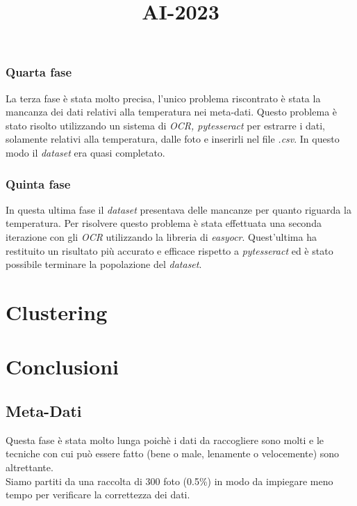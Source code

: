 \title{AI-2023}\documentclass[12pt,a4paper,twoside]{article}
\begin{document}
\subsubsection{Quarta fase}
La terza fase è stata molto precisa, l'unico problema riscontrato è stata la mancanza dei dati relativi alla temperatura nei meta-dati. Questo problema è stato risolto utilizzando un sistema di \textit{OCR, pytesseract} per estrarre i dati, solamente relativi alla temperatura, dalle foto e inserirli nel file \textit{.csv}. In questo modo il \textit{dataset} era quasi completato.
\subsubsection{Quinta fase}
In questa ultima fase il \textit{dataset} presentava delle mancanze per quanto riguarda la temperatura. Per risolvere questo problema è stata effettuata una seconda iterazione con gli \textit{OCR} utilizzando la libreria di \textit{easyocr}. Quest'ultima ha restituito un risultato più accurato e efficace rispetto a \textit{pytesseract} ed è stato possibile terminare la popolazione del \textit{dataset}.
\section{Clustering}

\section{Conclusioni}

\subsection{Meta-Dati}
Questa fase è stata molto lunga poichè i dati da raccogliere sono molti e le tecniche con cui può essere fatto 
(bene o male, lenamente o velocemente) sono altrettante.\\
Siamo partiti da una raccolta di 300 foto (0.5\%) in modo da impiegare meno tempo per verificare la correttezza 
dei dati.
\end{document}
